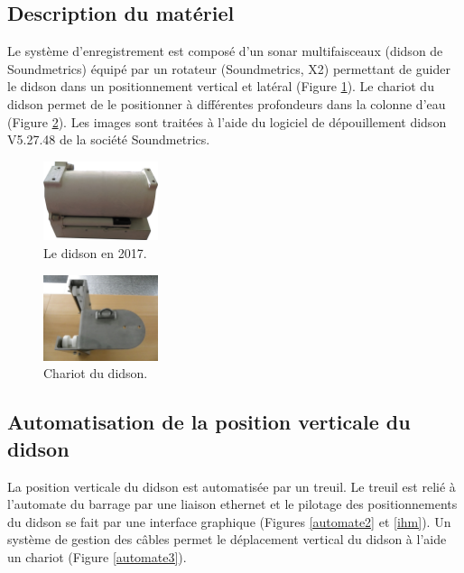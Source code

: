 \documentclass[11pt,twocolumn,titlepage,twoside]{article}
\begin{document}
\subsection{Description du matériel}

Le système d'enregistrement est composé d'un sonar multifaisceaux (didson de
Soundmetrics) équipé par un rotateur (Soundmetrics, X2) permettant de guider le
didson dans un positionnement vertical et latéral (Figure
\ref{didson2017}). Le chariot du didson permet de le positionner à différentes
profondeurs dans la colonne d'eau (Figure
\ref{chariot}). Les images sont traitées à l'aide du logiciel de dépouillement
didson V5.27.48 de la société Soundmetrics. 



\begin{figure}[htbp]
\centering
\includegraphics[width=0.3\textwidth]{didson.png}
\caption[Le didson en 2017]{Le didson en 2017.
}
\label{didson2017}
\end{figure}


\begin{figure}[htbp]
\centering
\includegraphics[width=0.3\textwidth]{chariot}
\caption[Chariot du didson]{Chariot du didson.}
\label{chariot}
\end{figure}

\subsection{Automatisation de la position verticale du didson}

La position verticale du didson est automatisée par un treuil. 
Le treuil est relié à l'automate du barrage par une liaison
ethernet et le pilotage des positionnements du didson se fait par une
interface graphique (Figures \ref{automate2} et \ref{ihm}).
Un système de gestion
des câbles permet le déplacement vertical du didson à l'aide un chariot (Figure
\ref{automate3}).
\end{document}

